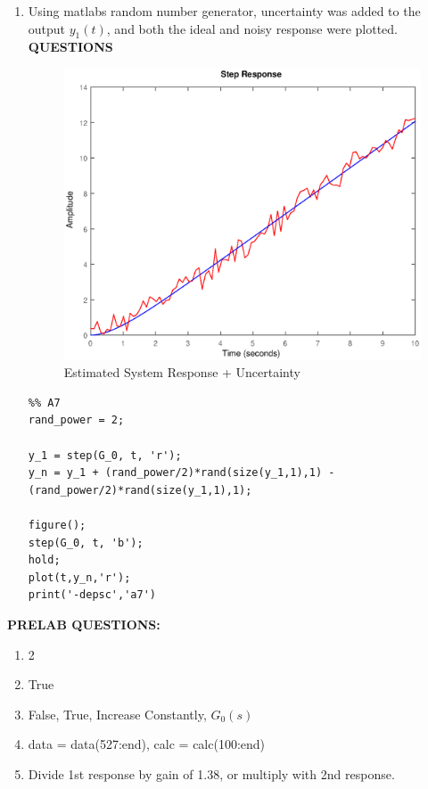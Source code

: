 \documentclass[11pt,a4paper]{article}
\begin{document}
\begin{enumerate}
    
    \pagebreak
    \item Using matlabs random number generator, uncertainty was added to the output $y_1(t)$, and both the ideal and noisy response were plotted. \textbf{QUESTIONS}
    \begin{figure}[H]
	\centering
	\includegraphics[width=.8\textwidth]{PreLach/a7.eps}
	\caption{\label{fig:rand}Estimated System Response + Uncertainty}
	\end{figure}
    \begin{lstlisting}
%% A7
rand_power = 2;

y_1 = step(G_0, t, 'r');
y_n = y_1 + (rand_power/2)*rand(size(y_1,1),1) - (rand_power/2)*rand(size(y_1,1),1);

figure();
step(G_0, t, 'b');
hold;
plot(t,y_n,'r');
print('-depsc','a7')

	\end{lstlisting}
    
\end{enumerate}

\pagebreak
\textbf{PRELAB QUESTIONS:}
\begin{enumerate}
	\item 2
	\item True
	\item False, True, Increase Constantly, $G_0(s)$
	\item data = data(527:end), calc = calc(100:end)
	\item Divide 1st response by gain of 1.38, or multiply with 2nd response. 
\end{enumerate}
\end{document}
